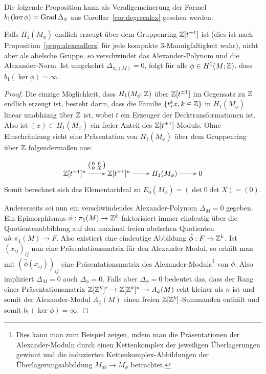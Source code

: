     Die folgende Proposition kann als Verallgemeinerung der Formel $b_1(\ker\phi)=\operatorname{Grad}\Delta_\phi$ aus Corollar~\ref{cor:degreealex} gesehen werden:
    \begin{prop}
    	Falls $H_1(M_\phi)$ endlich erzeugt über dem Gruppenring $\mathbb{Z}[t^{\pm 1}]$ ist (dies ist nach Proposition~\ref{prop:alexendlerz} für jede kompakte 3-Mannigfaltigkeit wahr), nicht aber als abelsche Gruppe, so verschwindet das Alexander-Polynom und die Alexander-Norm. Ist umgekehrt $\Delta_{\pi_1(M)}=0$, folgt für alle $\phi\in H^1(M;\mathbb{Z})$, dass $b_1(\ker\phi)=\infty$.
    \end{prop}
    \begin{proof}
    	Die einzige Möglichkeit, dass $H_1(M_\phi;\mathbb{Z})$ über $\mathbb{Z}[t^{\pm 1}]$ im Gegensatz zu $\mathbb{Z}$ endlich erzeugt ist, besteht darin, dass die Familie $\{t_*^kx,k\in\mathbb{Z}\}$ in $H_1(M_\phi)$ linear unabhänig über $\mathbb{Z}$ ist, wobei $t$ ein Erzeuger der Decktransformationen ist. Also ist $(x)\subset H_1(M_\phi)$ ein freier Anteil des $\mathbb{Z}[t^{\pm 1}]$-Moduls. Ohne Einschränkung sieht eine Präsentation von $H_1(M_\phi)$ über dem Gruppenring über $\mathbb{Z}$ folgendermaßen aus:
    	\[
    		\begin{xy}
    			\xymatrix@L+3pt{\laurent \ZZ t ^n \ar[r]^{\bigl(\begin{smallmatrix}0&0\\0&X\end{smallmatrix}\bigr)} & \laurent \ZZ t ^n \ar[r] &H_1(M_\phi) \ar[r] &0}
    		\end{xy}
    	\]
    	Somit berechnet sich das Elementarideal zu $E_0(M_\phi)=(\det 0\det X)=(0)$.%

    	Andererseits sei nun ein verschwindendes Alexander-Polynom $\Delta_{M}=0$ gegeben. Ein Epimorphismus $\phi: \pi_1(M) \to \mathbb{Z}^k$ faktorisiert immer eindeutig über die Quotientenabbildung auf den maximal freien abelschen Quotienten $ab:\pi_1(M) \to F$. Also existiert eine eindeutige Abbildung $\hat \phi: F \to \mathbb{Z}^k$. Ist  $(x_{ij})_{ij}$ nun eine Präsentationsmatrix für den Alexander-Modul, so erhält man mit $(\hat \phi(x_{ij}))_{ij}$ eine Präsentationsmatrix des Alexander-Moduls\footnote{Dies kann man zum Beispiel zeigen, indem man die Präsentationen der Alexander-Moduln durch einen Kettenkomplex der jeweiligen Überlagerungen gewinnt und die induzierten Kettenkomplex-Abbildungen der Überlagerungsabbildung $M_{ab} \to M_\phi $ betrachtet.} von $\phi$. Also impliziert $\Delta_M=0$ auch $\Delta_\phi=0$. Falls aber $\Delta_\phi=0$ bedeutet das, dass der Rang einer Präsentationsmatrix $\mathbb{Z}[\mathbb{Z}^k]^r \to \mathbb{Z}[\mathbb{Z}^k]^n \twoheadrightarrow A_\phi(M)$ echt kleiner als $n$ ist und somit der Alexander-Modul $A_\phi(M)$ einen freien $\mathbb{Z}[\mathbb{Z}^k]$-Summanden enthält und somit $b_1(\ker\phi)=\infty$. 
    \end{proof}

